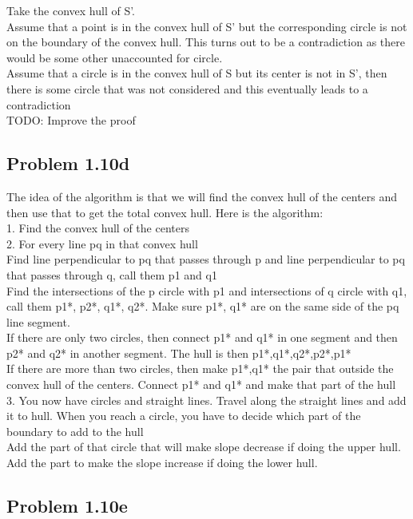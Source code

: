 \documentclass[11pt,psfig]{article}
\begin{document}
Take the convex hull of S'. 
\\
Assume that a point is in the convex hull of S' but the corresponding circle is not on the boundary of the convex hull. This turns out to be a contradiction as there would be some other unaccounted for circle. \\
Assume that a circle is in the convex hull of S but its center is not in S', then there is some circle that was not considered and this eventually leads to a contradiction
\\
TODO: Improve the proof

\subsection*{Problem 1.10d}

The idea of the algorithm is that we will find the convex hull of the centers and then use that to get the total convex hull. Here is the algorithm:\\
1. Find the convex hull of the centers\\
2. For every line pq in that convex hull\\
			Find line perpendicular to pq that passes through p and line perpendicular to pq that passes through q, call them p1 and q1\\
			Find the intersections of the p circle with p1 and intersections of q circle with q1, call them p1*, p2*, q1*, q2*. Make sure p1*, q1* are on the same side of the pq line segment. \\
			If there are only two circles, then connect p1* and q1* in one segment and then p2* and q2* in another segment. The hull is then p1*,q1*,q2*,p2*,p1*\\
			If there are more than two circles, then make p1*,q1* the pair that outside the convex hull of the centers. Connect p1* and q1* and make that part of the hull\\
3. You now have circles and straight lines. Travel along the straight lines and add it to hull. When you reach a circle, you have to decide which part of the boundary to add to the hull\\
			Add the part of that circle that will make slope decrease if doing the upper hull.\\
			Add the part to make the slope increase if doing the lower hull.

\subsection*{Problem 1.10e}
\end{document}
